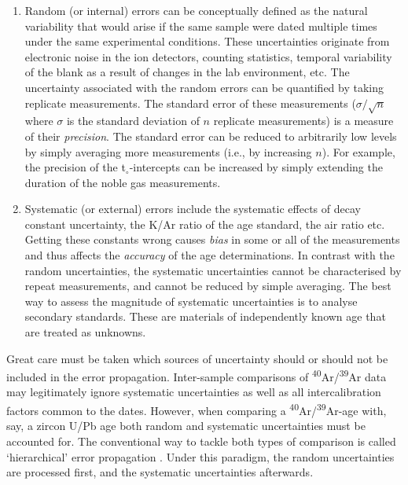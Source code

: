 \documentclass{article}
\begin{document}
\begin{enumerate}
  \item Random (or internal) errors can be conceptually defined as the
    natural variability that would arise if the same sample were dated
    multiple times under the same experimental conditions. These
    uncertainties originate from electronic noise in the ion
    detectors, counting statistics, temporal variability of the blank
    as a result of changes in the lab environment, etc. The
    uncertainty associated with the random errors can be quantified by
    taking replicate measurements. The standard error of these
    measurements ($\sigma/\sqrt{n}$ where $\sigma$ is the standard
    deviation of $n$ replicate measurements) is a measure of their
    \emph{precision}. The standard error can be reduced to arbitrarily
    low levels by simply averaging more measurements (i.e., by
    increasing $n$). For example, the precision of the
    t$_\circ$-intercepts can be increased by simply extending the
    duration of the noble gas measurements.
  \item Systematic (or external) errors include the systematic effects
    of decay constant uncertainty, the K/Ar ratio of the age standard,
    the air ratio etc. Getting these constants wrong causes
    \emph{bias} in some or all of the measurements and thus affects
    the \emph{accuracy} of the age determinations. In contrast with
    the random uncertainties, the systematic uncertainties cannot be
    characterised by repeat measurements, and cannot be reduced by
    simple averaging. The best way to assess the magnitude of
    systematic uncertainties is to analyse secondary standards.  These
    are materials of independently known age that are treated as
    unknowns.
\end{enumerate}

Great care must be taken which sources of uncertainty should or should
not be included in the error propagation.  Inter-sample comparisons of
\textsuperscript{40}Ar/\textsuperscript{39}Ar data may legitimately
ignore systematic uncertainties as well as all intercalibration
factors common to the dates. However, when comparing a
\textsuperscript{40}Ar/\textsuperscript{39}Ar-age with, say, a zircon
U/Pb age both random and systematic uncertainties must be accounted
for. The conventional way to tackle both types of comparison is called
`hierarchical' error propagation \citep{renne1998, min2000}.  Under
this paradigm, the random uncertainties are processed first, and the
systematic uncertainties afterwards.\\
\end{document}
